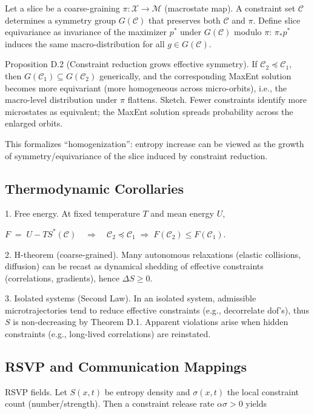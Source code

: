 \documentclass{article}
\begin{document}
Let a slice be a coarse-graining $\pi:\mathcal{X}\to \mathcal{M}$ (macrostate map). A constraint set $\mathcal{C}$ determines a symmetry group $G(\mathcal{C})$ that preserves both $\mathcal{C}$ and $\pi$.
Define slice equivariance as invariance of the maximizer $p^*$ under $G(\mathcal{C})$ modulo $\pi$: $\pi_*p^*$ induces the same macro-distribution for all $g\in G(\mathcal{C})$.

Proposition D.2 (Constraint reduction grows effective symmetry).
If $\mathcal{C}_2 \preceq \mathcal{C}_1$, then $G(\mathcal{C}_1)\subseteq G(\mathcal{C}_2)$ generically, and the corresponding MaxEnt solution becomes more equivariant (more homogeneous across micro-orbits), i.e., the macro-level distribution under $\pi$ flattens.
Sketch. Fewer constraints identify more microstates as equivalent; the MaxEnt solution spreads probability across the enlarged orbits.

This formalizes “homogenization”: entropy increase can be viewed as the growth of symmetry/equivariance of the slice induced by constraint reduction.

\subsection{Thermodynamic Corollaries}

1. Free energy. At fixed temperature $T$ and mean energy $U$,

$F \;=\; U - T S^*(\mathcal{C}) \quad\Rightarrow\quad 
   \mathcal{C}_2 \preceq \mathcal{C}_1 \;\Longrightarrow\; F(\mathcal{C}_2)\le F(\mathcal{C}_1)$.

2. H-theorem (coarse-grained). Many autonomous relaxations (elastic collisions, diffusion) can be recast as dynamical shedding of effective constraints (correlations, gradients), hence $\Delta S\ge 0$.

3. Isolated systems (Second Law). In an isolated system, admissible microtrajectories tend to reduce effective constraints (e.g., decorrelate dof’s), thus $S$ is non-decreasing by Theorem D.1. Apparent violations arise when hidden constraints (e.g., long-lived correlations) are reinstated.

\subsection{RSVP and Communication Mappings}

RSVP fields. Let $S(x,t)$ be entropy density and $\sigma(x,t)$ the local constraint count (number/strength). Then a constraint release rate $\alpha \sigma >0$ yields
\end{document}
